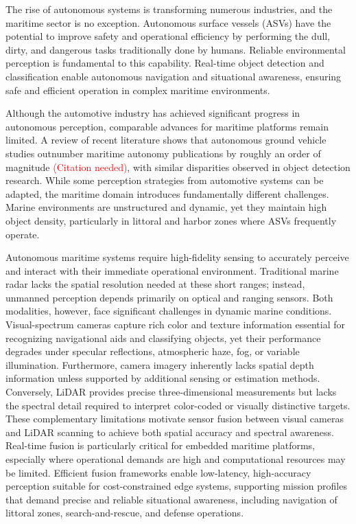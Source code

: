 \documentclass[../main.tex]{subfiles}
\begin{document}

The rise of autonomous systems is transforming numerous industries, and the maritime sector is no exception. Autonomous surface vessels (\acp{ASV}) have the potential to improve safety and operational efficiency by performing the dull, dirty, and dangerous tasks traditionally done by humans.
Reliable environmental perception is fundamental to this capability. 
Real-time object detection and classification enable autonomous navigation and situational awareness, ensuring safe and efficient operation in complex maritime environments.

Although the automotive industry has achieved significant progress in autonomous perception, comparable advances for maritime platforms remain limited. 
A review of recent literature shows that autonomous ground vehicle studies outnumber maritime autonomy publications by roughly an order of magnitude \textcolor{red}{(Citation needed)}, with similar disparities observed in object detection research. 
While some perception strategies from automotive systems can be adapted, the maritime domain introduces fundamentally different challenges. 
Marine environments are unstructured and dynamic, yet they maintain high object density, particularly in littoral and harbor zones where \acp{ASV} frequently operate.

Autonomous maritime systems require high-fidelity sensing to accurately perceive and interact with their immediate operational environment.
Traditional marine radar lacks the spatial resolution needed at these short ranges; instead, unmanned perception depends primarily on optical and ranging sensors.
Both modalities, however, face significant challenges in dynamic marine conditions.
Visual-spectrum cameras capture rich color and texture information essential for recognizing navigational aids and classifying objects, yet their performance degrades under specular reflections, atmospheric haze, fog, or variable illumination.
Furthermore, camera imagery inherently lacks spatial depth information unless supported by additional sensing or estimation methods.
Conversely, \ac{LiDAR} provides precise three-dimensional measurements but lacks the spectral detail required to interpret color-coded or visually distinctive targets.
These complementary limitations motivate sensor fusion between visual cameras and \ac{LiDAR} scanning to achieve both spatial accuracy and spectral awareness.
Real-time fusion is particularly critical for embedded maritime platforms, especially where operational demands are high and computational resources may be limited.
Efficient fusion frameworks enable low-latency, high-accuracy perception suitable for cost-constrained edge systems, supporting mission profiles that demand precise and reliable situational awareness, including navigation of littoral zones, search-and-rescue, and defense operations.
\end{document}

